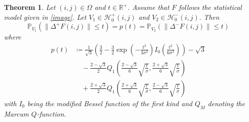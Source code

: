 \documentclass[a4paper,12pt]{article}
\newcommand{\norm}[1]{\lVert#1\rVert}
\theoremstyle{plain}
\newtheorem{theorem}{Theorem}[section]
\theoremstyle{definition}
\begin{document}
\begin{theorem}\label{thmeqcdf}
	Let $(i, j) \in \Omega$ and $t \in \mathbb{R}^+$. Assume that $F$ follows the statistical model given in \eqref{image}. Let $V_1 \in \mathcal{H}_0^+(i, j)$ and $V_2 \in \mathcal{H}_0^-(i, j)$. Then
	\begin{equation}\label{eqprobequality}
		\mathbb{P}_{V_1}( \norm{\Delta^+ F(i, j)} \leq t ) = p(t) = \mathbb{P}_{V_2}( \norm{\Delta^- F(i, j)} \leq t )
	\end{equation}
	where
	\begin{equation}\label{eqcdf}
		\begin{aligned}
			p(t) &\coloneqq \frac{1}{\sqrt{3}} \left( \frac{3}{2} - \frac{3}{2} \exp \left( - \frac{t^2}{3 \sigma^2} \right) I_0 \left( \frac{t^2}{6 \sigma^2} \right) \right) - \sqrt{3} \\
			&\quad - \frac{2 - \sqrt{3}}{2} Q_1 \left( \frac{2 - \sqrt{3}}{6} \sqrt{\frac{t}{\sigma}}, \frac{2 + \sqrt{3}}{6} \sqrt{\frac{t}{\sigma}} \right) \\
			&\quad + \frac{2 + \sqrt{3}}{2} Q_1 \left( \frac{2 + \sqrt{3}}{6} \sqrt{\frac{t}{\sigma}}, \frac{2 - \sqrt{3}}{6} \sqrt{\frac{t}{\sigma}} \right)
		\end{aligned}
	\end{equation}
	with $I_0$ being the modified Bessel function of the first kind and $Q_M$ denoting the Marcum $Q$-function.
\end{theorem}
\end{document}
